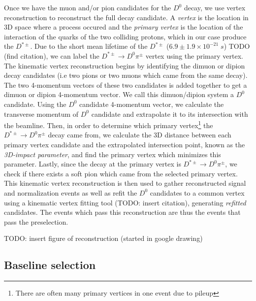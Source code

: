 Once we have the muon and/or pion candidates for the $D^0$ decay, we use vertex reconstruction to reconstruct the full decay candidate. A \textit{vertex} is the location in 3D space where a process occured and the \textit{primary vertex} is the location of the interaction of the quarks of the two colliding protons, which in our case produce the $D^{*\pm}$. Due to the short mean lifetime of the $D^{*\pm}$ ($ 6.9 \pm 1.9 \times 10^{-21} \; s$) TODO (find citation), we can label the $D^{*\pm} \to D^0 \pi^\pm$ vertex using the primary vertex. The kinematic vertex reconstruction begins by identifying the dimuon or dipion decay candidates (i.e two pions or two muons which came from the same decay). The two 4-momentum vectors of these two candidates is added together to get a dimuon or dipion 4-momentum vector. We call this dimuon/dipion system a $D^0$ candidate. Using the $D^0$ candidate 4-momentum vector, we calculate the transverse momentum of $D^0$ candidate and extrapolate it to its intersection with the beamline. Then, in order to determine which primary vertex\footnote{There are often many primary vertices in one event due to pileup} the $D^{*\pm} \to D^0 \pi^\pm$ decay came from, we calculate the 3D distance between each primary vertex candidate and the extrapolated intersection point, known as the \textit{3D-impact parameter}, and find the primary vertex which minimizes this parameter. Lastly, since the decay at the primary vertex is $D^{*\pm} \to D^0 \pi^\pm$, we check if there exists a soft pion which came from the selected primary vertex. This kinematic vertex reconstruction is then used to gather reconstructed signal and normalization events as well as refit the $D^0$ candidates to a common vertex using a kinematic vertex fitting tool (TODO: insert citation), generating \textit{refitted} candidates. The events which pass this reconstruction are thus the events that pass the preselection. 

TODO: insert figure of reconstruction (started in google drawing)

\subsection{Baseline selection}

